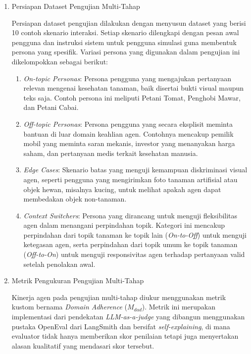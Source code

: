 \begin{enumerate}[label=\alph*., listparindent=\parindent, labelindent=0pt]
    \item Persiapan Dataset Pengujian Multi-Tahap

    Persiapan dataset pengujian dilakukan dengan menyusun dataset yang berisi 10 contoh skenario interaksi. Setiap skenario dilengkapi dengan pesan awal pengguna dan instruksi sistem untuk pengguna simulasi guna membentuk persona yang spesifik. Variasi persona yang digunakan dalam pengujian ini dikelompokkan sebagai berikut:

\begin{enumerate}[label=\alph*., listparindent=\parindent, labelindent=0pt]
    \item \textit{On-topic Personas}: Persona pengguna yang mengajukan pertanyaan relevan mengenai kesehatan tanaman, baik disertai bukti visual maupun teks saja. Contoh persona ini meliputi Petani Tomat, Penghobi Mawar, dan Petani Cabai.
    \item \textit{Off-topic Personas}: Persona pengguna yang secara eksplisit meminta bantuan di luar domain keahlian agen. Contohnya mencakup pemilik mobil yang meminta saran mekanis, investor yang menanyakan harga saham, dan pertanyaan medis terkait kesehatan manusia.
    \item \textit{Edge Cases}: Skenario batas yang menguji kemampuan diskriminasi visual agen, seperti pengguna yang mengirimkan foto tanaman artifisial atau objek hewan, misalnya kucing, untuk melihat apakah agen dapat membedakan objek non-tanaman.
    \item \textit{Context Switchers}: Persona yang dirancang untuk menguji fleksibilitas agen dalam menangani perpindahan topik. Kategori ini mencakup perpindahan dari topik tanaman ke topik lain (\textit{On-to-Off}) untuk menguji ketegasan agen, serta perpindahan dari topik umum ke topik tanaman (\textit{Off-to-On}) untuk menguji responsivitas agen terhadap pertanyaan valid setelah penolakan awal.
\end{enumerate}

\item Metrik Pengukuran Pengujian Multi-Tahap

Kinerja agen pada pengujian multi-tahap diukur menggunakan metrik kustom bernama \textit{Domain Adherence} ($M_{dad}$). Metrik ini merupakan implementasi dari pendekatan \textit{LLM-as-a-judge} yang dibangun menggunakan pustaka OpenEval dari LangSmith dan bersifat \textit{self-explaining}, di mana evaluator tidak hanya memberikan skor penilaian tetapi juga menyertakan alasan kualitatif yang mendasari skor tersebut.


\end{enumerate}
